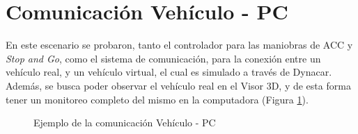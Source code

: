 \section{Comunicación Vehículo - PC}

En este escenario se probaron, tanto el controlador para las maniobras de ACC y \textit{Stop and Go}, como el sistema de comunicación, para la conexión entre un vehículo real, y un vehículo virtual, el cual es simulado a través de Dynacar. Además, se busca poder observar el vehículo real en el Visor 3D, y de esta forma tener un monitoreo completo del mismo en la computadora (Figura \ref{fig:cardynacar}).\\

\begin{figure}[H]
 \centering
 \caption{Ejemplo de la comunicación Vehículo - PC}
 \label{fig:cardynacar}
\end{figure}

